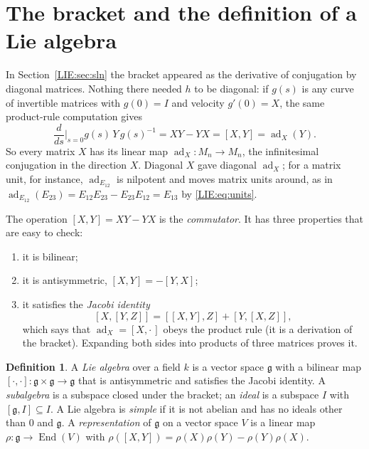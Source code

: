 \documentclass[11pt,openany]{book}
\theoremstyle{plain}
\theoremstyle{definition}
\newtheorem{definition}[theorem]{Definition}
\theoremstyle{remark}
\begin{document}
\section{The bracket and the definition of a Lie algebra}
\label{LIE:sec:bracket}

In Section~\ref{LIE:sec:sln} the bracket appeared as the derivative of conjugation by diagonal
matrices. Nothing there needed $h$ to be diagonal: if $g(s)$ is any curve of invertible matrices with
$g(0)=I$ and velocity $g'(0)=X$, the same product-rule computation gives
\[
  \frac{d}{ds}\Big|_{s=0}g(s)\,Y\,g(s)^{-1}=XY-YX=[X,Y]=\operatorname{ad}_X(Y).
\]
So every matrix $X$ has its linear map $\operatorname{ad}_X\colon M_n\to M_n$, the infinitesimal
conjugation in the direction $X$. Diagonal $X$ gave diagonal $\operatorname{ad}_X$; for a matrix unit,
for instance, $\operatorname{ad}_{E_{12}}$ is nilpotent and moves matrix units around, as in
$\operatorname{ad}_{E_{12}}(E_{23})=E_{12}E_{23}-E_{23}E_{12}=E_{13}$ by \eqref{LIE:eq:units}.

The operation $[X,Y]=XY-YX$ is the \emph{commutator}. It has three properties that are easy to
check:
\begin{enumerate}[label=(\roman*)]
\item it is bilinear;
\item it is antisymmetric, $[X,Y]=-[Y,X]$;
\item it satisfies the \emph{Jacobi identity}
  \[
    [X,[Y,Z]]=[[X,Y],Z]+[Y,[X,Z]],
  \]
  which says that $\operatorname{ad}_X=[X,\cdot\,]$ obeys the product rule (it is a derivation of the
  bracket). Expanding both sides into products of three matrices proves it.
\end{enumerate}

\begin{definition}\label{LIE:def:liealg}
A \emph{Lie algebra} over a field $k$ is a vector space $\mathfrak g$ with a bilinear map
$[\cdot,\cdot]\colon\mathfrak g\times\mathfrak g\to\mathfrak g$ that is antisymmetric and satisfies the
Jacobi identity. A \emph{subalgebra} is a subspace closed under the bracket; an \emph{ideal} is a
subspace $I$ with $[\mathfrak g,I]\subseteq I$. A Lie algebra is \emph{simple} if it is not abelian and
has no ideals other than $0$ and $\mathfrak g$. A \emph{representation} of $\mathfrak g$ on a vector space
$V$ is a linear map $\rho\colon\mathfrak g\to\operatorname{End}(V)$ with
$\rho([X,Y])=\rho(X)\rho(Y)-\rho(Y)\rho(X)$.
\end{definition}
\end{document}

